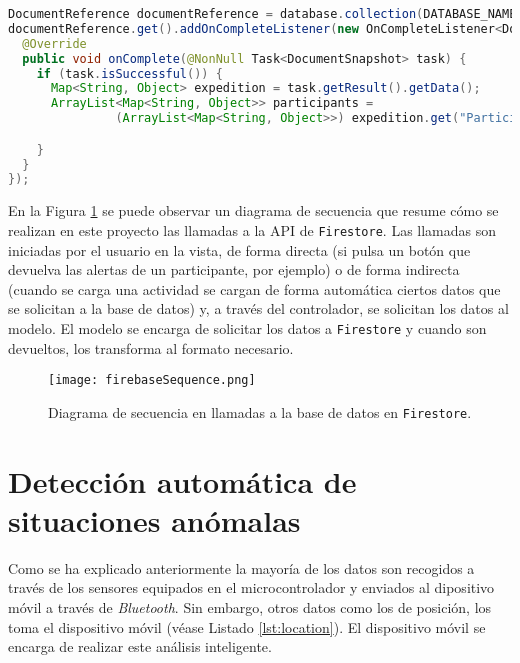 \begin{lstlisting}[language=java,captionpos=t,caption={\textbf{Obtención de todos los participantes de una determinada expedición.}},label={lst:firestorecode}]
DocumentReference documentReference = database.collection(DATABASE_NAME).document(expedition_name);
documentReference.get().addOnCompleteListener(new OnCompleteListener<DocumentSnapshot>() {
  @Override
  public void onComplete(@NonNull Task<DocumentSnapshot> task) {
    if (task.isSuccessful()) {
      Map<String, Object> expedition = task.getResult().getData();
      ArrayList<Map<String, Object>> participants =
               (ArrayList<Map<String, Object>>) expedition.get("Participants");

    }
  }
});
\end{lstlisting}

En la Figura \ref{fig:firebaseSequence} se puede observar un diagrama de secuencia que resume cómo se realizan en este proyecto las llamadas a la \ac{API} de \texttt{Firestore}. Las llamadas son iniciadas por el usuario en la vista, de forma directa (si pulsa un botón que devuelva las alertas de un participante, por ejemplo) o de forma indirecta (cuando se carga una actividad se cargan de forma automática ciertos datos que se solicitan a la base de datos) y, a través del controlador, se solicitan los datos al modelo. El modelo se encarga de solicitar los datos a \texttt{Firestore} y cuando son devueltos, los transforma al formato necesario. 

\begin{figure}[!h]
\begin{center}
\texttt{[image: firebaseSequence.png]}
\caption{Diagrama de secuencia en llamadas a la base de datos en \texttt{Firestore}.}
\label{fig:firebaseSequence}
\end{center}
\end{figure}

\section{Detección automática de situaciones anómalas}

Como se ha explicado anteriormente la mayoría de los datos son recogidos a través de los sensores equipados en el microcontrolador y enviados al dipositivo móvil a través de \textit{Bluetooth}. Sin embargo, otros datos como los de posición, los toma el dispositivo móvil (véase Listado \ref{lst:location}). El dispositivo móvil se encarga de realizar este análisis inteligente.


